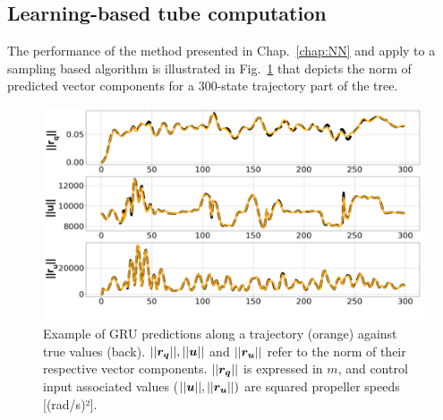 \subsection{Learning-based tube computation} \label{results:NNresult}

The performance of the method presented in Chap.~\ref{chap:NN} and apply to a sampling based algorithm is illustrated in Fig.~\ref{fig: NN pred} that depicts the norm of predicted vector components for a 300-state trajectory part of the tree.


\begin{figure} [t]
    \centering
    \includegraphics[width=0.8\linewidth]{figures/robust_accurate/PredNorm.png} 
    \caption{Example of GRU predictions along a trajectory (orange) against true values (back). $||\boldsymbol{r_q}||, ||\boldsymbol{u}||$ and $||\boldsymbol{r_u}||$ refer to the norm of their respective vector components. $||\boldsymbol{r_q}||$ is expressed in $m$, and control input associated values ($||\boldsymbol{u}||,||\boldsymbol{r_u}||)$ are squared propeller speeds [(rad/s)²].}%
    \label{fig: NN pred}%
\end{figure}

